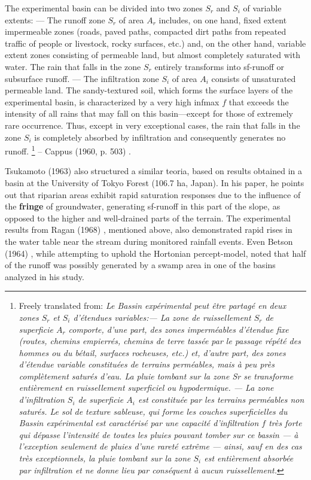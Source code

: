 \documentclass[./main_en.tex]{subfiles}
\begin{document}
\begin{adjustwidth}{100pt}{0pt}
\medskip
\small
The experimental basin can be divided into two zones \(S_r\) and \(S_i\) of variable extents: --- The runoff zone \(S_r\) of area \(A_r\) includes, on one hand, fixed extent impermeable zones (roads, paved paths, compacted dirt paths from repeated traffic of people or livestock, rocky surfaces, etc.) and, on the other hand, variable extent zones consisting of permeable land, but almost completely saturated with water. The rain that falls in the zone \(S_r\) entirely transforms into \gls{sf-runoff} or subsurface runoff. --- The infiltration zone \(S_i\) of area \(A_i\) consists of unsaturated permeable land. The sandy-textured soil, which forms the surface layers of the experimental basin, is characterized by a very high \gls{infmax} \(f\) that exceeds the intensity of all rains that may fall on this basin—except for those of extremely rare occurrence. Thus, except in very exceptional cases, the rain that falls in the zone \(S_i\) is completely absorbed by infiltration and consequently generates no runoff.
\footnote{Freely translated from: 
\textit{
Le Bassin expérimental peut être partagé en deux zones $S_r$ et $S_i$ d'étendues variables:\;--- La zone de ruissellement $S_r$ de superficie $A_r$ comporte, d'une part, des zones imperméables d'étendue fixe (routes, chemins empierrés, chemins de terre tassée par le passage répété des hommes ou du bétail, surfaces rocheuses, etc.) et, d'autre part, des zones d'étendue variable constituées de terrains perméables, mais à peu près complètement saturés d'eau. La pluie tombant sur la zone Sr se transforme entièrement en ruissellement superficiel ou hypodermique. --- La zone d'infiltration $S_i$ de superficie $A_i$ est constituée par les terrains perméables non saturés. Le sol de texture sableuse, qui forme les couches superficielles du Bassin expérimental est caractérisé par une capacité d'infiltration $f$ très forte qui dépasse l'intensité de toutes les pluies pouvant tomber sur ce bassin — à l'exception seulement de pluies d'une rareté extrême — ainsi, sauf en des cas très exceptionnels, la pluie tombant sur la zone $S_i$ est entièrement absorbée par infiltration et ne donne lieu par conséquent à aucun ruissellement.
}} -- Cappus (1960, p. 503) \cite{Cappus1960}.
\medskip
\end{adjustwidth}

\noindent Tsukamoto (1963) \cite{Tsukamoto1963} also structured a similar \gls{teoria}, based on results obtained in a basin at the University of Tokyo Forest (106.7 ha, Japan). In his paper, he points out that riparian areas exhibit rapid saturation responses due to the influence of the \textbf{\gls{fringe}} of groundwater, generating \gls{sf-runoff} in this part of the slope, as opposed to the higher and well-drained parts of the terrain. The experimental results from Ragan (1968) \cite{Ragan1968}, mentioned above, also demonstrated rapid rises in the water table near the stream during monitored rainfall events. Even Betson (1964) \cite{Betson1964}, while attempting to uphold the Hortonian \gls{percept-model}, noted that half of the runoff was possibly generated by a swamp area in one of the basins analyzed in his study.
\end{document}

